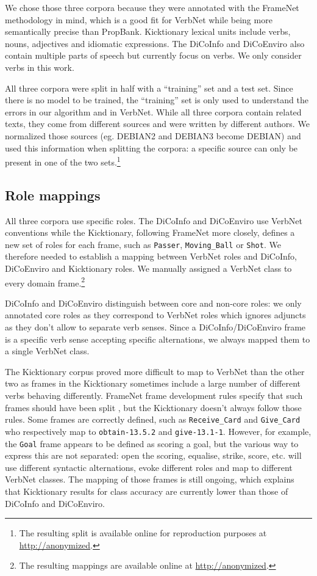 We chose those three corpora because they were annotated with the FrameNet
methodology in mind, which is a good fit for VerbNet while being more
semantically precise than PropBank. Kicktionary lexical units include verbs,
nouns, adjectives and idiomatic expressions. The DiCoInfo and DiCoEnviro also
contain multiple parts of speech but currently focus on verbs.  We only
consider verbs in this work.

All three corpora were split in half with a ``training'' set and a test set.
Since there is no model to be trained, the ``training'' set is only used to
understand the errors in our algorithm and in VerbNet. While all three corpora
contain related texts, they come from different sources and were written by
different authors. We normalized those sources (eg. DEBIAN2 and DEBIAN3 become
DEBIAN) and used this information when splitting the corpora: a specific source
can only be present in one of the two sets.\footnote{The resulting split is
available online for reproduction purposes at \url{http://anonymized}.}

\subsection{Role mappings}

All three corpora use specific roles. The DiCoInfo and DiCoEnviro use VerbNet
conventions while the Kicktionary, following FrameNet more closely, defines a
new set of roles for each frame, such as \texttt{Passer}, \texttt{Moving\_Ball}
or \texttt{Shot}. We therefore needed to establish a mapping between VerbNet
roles and DiCoInfo, DiCoEnviro and Kicktionary roles. We manually assigned a
VerbNet class to every domain frame.\footnote{The resulting mappings are
available online at \url{http://anonymized}.}

DiCoInfo and DiCoEnviro distinguish between core and non-core roles: we only
annotated core roles as they correspond to VerbNet roles which ignores adjuncts
as they don't allow to separate verb senses. Since a DiCoInfo/DiCoEnviro frame
is a specific verb sense accepting specific alternations, we always mapped them
to a single VerbNet class.

The Kicktionary corpus proved more difficult to map to VerbNet than the other
two as frames in the Kicktionary sometimes include a large number of different
verbs behaving differently. FrameNet frame development rules specify that such
frames should have been split \cite{ruppenhofer2006extended}, but the
Kicktionary doesn't always follow those rules. Some frames are correctly
defined, such as \texttt{Receive\_Card} and \texttt{Give\_Card} who
respectively map to \texttt{obtain-13.5.2} and \texttt{give-13.1-1}. However,
for example, the \texttt{Goal} frame appears to be defined as scoring a goal,
but the various way to express this are not separated: open the scoring,
equalise, strike, score, etc. will use different syntactic alternations, evoke
different roles and map to different VerbNet classes. The mapping of those
frames is still ongoing, which explains that Kicktionary results for class
accuracy are currently lower than those of DiCoInfo and DiCoEnviro.

